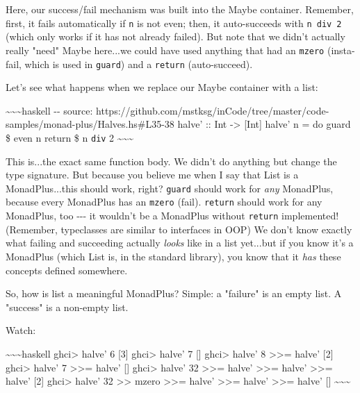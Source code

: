 \documentclass[]{article}
\begin{document}
Here, our success/fail mechanism was built into the Maybe container. Remember,
first, it fails automatically if \texttt{n} is not even; then, it auto-succeeds
with \texttt{n\ \textasciigrave{}div\textasciigrave{}\ 2} (which only works if
it has not already failed). But note that we didn't actually really "need" Maybe
here...we could have used anything that had an \texttt{mzero} (insta-fail, which
is used in \texttt{guard}) and a \texttt{return} (auto-succeed).

Let's see what happens when we replace our Maybe container with a list:

\textasciitilde{}\textasciitilde{}\textasciitilde{}haskell -\/- source:
https://github.com/mstksg/inCode/tree/master/code-samples/monad-plus/Halves.hs\#L35-38
halve' :: Int -\textgreater{} {[}Int{]} halve' n = do guard \$ even n return \$
n \texttt{div} 2 \textasciitilde{}\textasciitilde{}\textasciitilde{}

This is...the exact same function body. We didn't do anything but change the
type signature. But because you believe me when I say that List is a
MonadPlus...this should work, right? \texttt{guard} should work for \emph{any}
MonadPlus, because every MonadPlus has an \texttt{mzero} (fail). \texttt{return}
should work for any MonadPlus, too -\/-\/- it wouldn't be a MonadPlus without
\texttt{return} implemented! (Remember, typeclasses are similar to interfaces in
OOP) We don't know exactly what failing and succeeding actually \emph{looks}
like in a list yet...but if you know it's a MonadPlus (which List is, in the
standard library), you know that it \emph{has} these concepts defined somewhere.

So, how is list a meaningful MonadPlus? Simple: a "failure" is an empty list. A
"success" is a non-empty list.

Watch:

\textasciitilde{}\textasciitilde{}\textasciitilde{}haskell ghci\textgreater{}
halve' 6 {[}3{]} ghci\textgreater{} halve' 7 {[}{]} ghci\textgreater{} halve' 8
\textgreater{}\textgreater{}= halve' {[}2{]} ghci\textgreater{} halve' 7
\textgreater{}\textgreater{}= halve' {[}{]} ghci\textgreater{} halve' 32
\textgreater{}\textgreater{}= halve' \textgreater{}\textgreater{}= halve'
\textgreater{}\textgreater{}= halve' {[}2{]} ghci\textgreater{} halve' 32
\textgreater{}\textgreater{} mzero \textgreater{}\textgreater{}= halve'
\textgreater{}\textgreater{}= halve' \textgreater{}\textgreater{}= halve' {[}{]}
\textasciitilde{}\textasciitilde{}\textasciitilde{}
\end{document}
